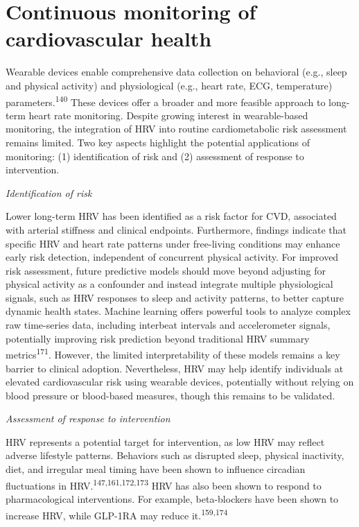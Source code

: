 \documentclass[
  a4paper,
  headsepline=true,
  open=left]{scrbook}
\begin{document}
\hypertarget{continuous-monitoring-of-cardiovascular-health}{%
\section{Continuous monitoring of cardiovascular
health}\label{continuous-monitoring-of-cardiovascular-health}}

Wearable devices enable comprehensive data collection on behavioral
(e.g., sleep and physical activity) and physiological (e.g., heart rate,
ECG, temperature) parameters.\textsuperscript{140} These devices offer a
broader and more feasible approach to long-term heart rate monitoring.
Despite growing interest in wearable-based monitoring, the integration
of HRV into routine cardiometabolic risk assessment remains limited. Two
key aspects highlight the potential applications of monitoring: (1)
identification of risk and (2) assessment of response to intervention.

\emph{Identification of risk}

Lower long-term HRV has been identified as a risk factor for CVD,
associated with arterial stiffness and clinical endpoints. Furthermore,
findings indicate that specific HRV and heart rate patterns under
free-living conditions may enhance early risk detection, independent of
concurrent physical activity. For improved risk assessment, future
predictive models should move beyond adjusting for physical activity as
a confounder and instead integrate multiple physiological signals, such
as HRV responses to sleep and activity patterns, to better capture
dynamic health states. Machine learning offers powerful tools to analyze
complex raw time-series data, including interbeat intervals and
accelerometer signals, potentially improving risk prediction beyond
traditional HRV summary metrics\textsuperscript{171}. However, the
limited interpretability of these models remains a key barrier to
clinical adoption. Nevertheless, HRV may help identify individuals at
elevated cardiovascular risk using wearable devices, potentially without
relying on blood pressure or blood-based measures, though this remains
to be validated.

\emph{Assessment of response to intervention}

HRV represents a potential target for intervention, as low HRV may
reflect adverse lifestyle patterns. Behaviors such as disrupted sleep,
physical inactivity, diet, and irregular meal timing have been shown to
influence circadian fluctuations in
HRV.\textsuperscript{147,161,172,173} HRV has also been shown to respond
to pharmacological interventions. For example, beta-blockers have been
shown to increase HRV, while GLP-1RA may reduce
it.\textsuperscript{159,174}
\end{document}
